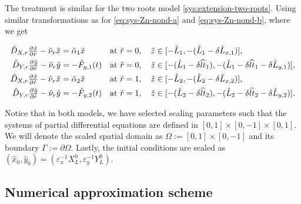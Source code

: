 \documentclass[11pt]{article}
\numberwithin{equation}{section}
\begin{document}
The treatment is similar for the two roots model \eqref{sys:extension-two-roots}. Using similar transformations as for \eqref{eq:sys-Zn-nond-a} and \eqref{eq:sys-Zn-nond-b}, where we get

\begin{subequations}
\begin{align}
    \hat{D}_{X,r} \pd{\hat{x}}{\hat{r}} - \hat{\nu}_r \hat{x} &= \hat{\alpha}_1 \hat{x}
    &\text{at } \hat{r} &= 0, \quad \hat{z} \in [-\hat{L}_1,-(\hat{L}_1 - \delta \hat{L}_{x,1})],
    \\
    \hat{D}_{Y,r} \pd{\hat{y}}{\hat{r}}  - \hat{\nu}_r \hat{y} &= -\hat{F}_{y,1}(t)     &\text{at } \hat{r} &= 0, \quad \hat{z} \in [-(\hat{L}_1 - \delta \widehat{lt}_1), -(\hat{L}_1 - \delta \widehat{lt}_1 - \delta \hat{L}_{y,1})],
    \\
    \hat{D}_{X,r} \pd{\hat{x}}{\hat{r}} - \hat{\nu}_r \hat{x} &= \hat{\alpha}_2 \hat{x}
    &\text{at } \hat{r} &= 1, \quad \hat{z} \in [-\hat{L}_2, -(\hat{L}_2 - \delta \hat{L}_{x,2})],
    \\
    \hat{D}_{Y,r} \pd{\hat{y}}{\hat{r}}  - \hat{\nu}_r \hat{y} &= -\hat{F}_{y,2}(t)     &\text{at } \hat{r} &= 1, \quad \hat{z} \in [-(\hat{L}_2 - \delta \widehat{lt}_2), -(\hat{L}_2 - \delta \widehat{lt}_2 - \delta \hat{L}_{y,2})].
\end{align}
\end{subequations}

Notice that in both models, we have selected scaling parameters such that the systems of partial differential equations are defined in \([0,1]\times [0,-1] \times [0,1]\). We will denote the scaled spatial domain as \(\Omega := [0,1]\times [0,-1]\) and its boundary \(\Gamma := \partial \Omega\).
Lastly, the initial conditions are scaled as \( (\hat{x}_0,\hat{y}_0) = (\varepsilon_x^{-1} X^0_L, \varepsilon_y^{-1} Y^0_L) \). 




\subsection{Numerical approximation scheme}
\label{sec:Numerics-base}
\end{document}
